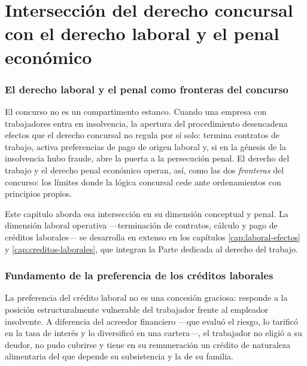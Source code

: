 \chapter{Intersección del derecho concursal con el derecho laboral y el penal económico}
\label{cap:laboral-penal}


\bloqueTeorico

\subsection{El derecho laboral y el penal como fronteras del concurso}

El concurso no es un compartimento estanco. Cuando una empresa con trabajadores entra en
insolvencia, la apertura del procedimiento desencadena efectos que el derecho concursal no
regula por sí solo: termina contratos de trabajo, activa preferencias de pago de origen
laboral y, si en la génesis de la insolvencia hubo fraude, abre la puerta a la persecución
penal. El derecho del trabajo y el derecho penal económico operan, así, como las dos
\emph{fronteras} del concurso: los límites donde la lógica concursal cede ante ordenamientos
con principios propios.

Este capítulo aborda esa intersección en su dimensión conceptual y penal. La dimensión
laboral operativa ---terminación de contratos, cálculo y pago de créditos laborales--- se
desarrolla en extenso en los capítulos \ref{cap:laboral-efectos} y
\ref{cap:creditos-laborales}, que integran la Parte dedicada al derecho del trabajo.

\subsection{Fundamento de la preferencia de los créditos laborales}

La preferencia del crédito laboral no es una concesión graciosa: responde a la posición
estructuralmente vulnerable del trabajador frente al empleador insolvente. A diferencia del
acreedor financiero ---que evaluó el riesgo, lo tarificó en la tasa de interés y lo
diversificó en una cartera---, el trabajador no eligió a su deudor, no pudo cubrirse y tiene
en su remuneración un crédito de naturaleza alimentaria del que depende su subsistencia y la
de su familia.

